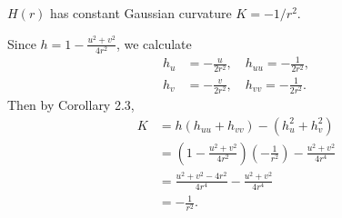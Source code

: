\documentclass[10pt]{report}
\begin{document}
\pagebreak
\begin{exer}[7.2: 4]
	$H(r)$ has constant Gaussian curvature $K=-1/r^2$.
\end{exer}
Since $h = 1 - \frac{u^2+v^2}{4r^2}$, we calculate
\begin{align*}
	h_{u} &= -\frac{u}{2r^2}, \quad h_{uu} = -\frac{1}{2r^2}, \\
	h_{v} &= -\frac{v}{2r^2}, \quad h_{vv} = -\frac{1}{2r^2} .
\end{align*}
Then by Corollary 2.3,
\begin{align*}
	K &= h(h_{uu}+h_{vv})-(h_{u}^2+h_{v}^2) \\
	  &= \left( 1-\frac{u^2+v^2}{4r^2}  \right)\left( -\frac{1}{r^2}  \right)- \frac{u^2+v^2}{4r^4} \\
	  &= \frac{u^2+v^2-4r^2}{4r^4} - \frac{u^2+v^2}{4r^4} \\
	  &= -\frac{1}{r^2} .
\end{align*}
\end{document}
